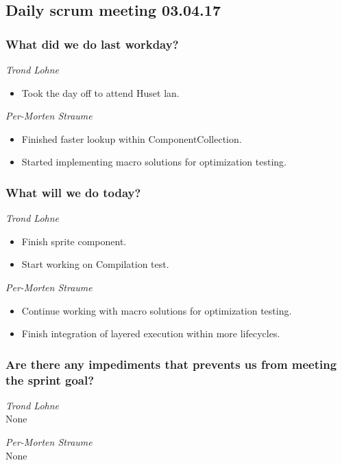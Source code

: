 \documentclass{article}
\begin{document}
\begin{center}
\subsection*{Daily scrum meeting 03.04.17}
\end{center}
\bigskip


\subsubsection*{What did we do last workday?}

\noindent\textit{Trond Lohne}
\begin{itemize}
    \item
    Took the day off to attend Huset lan.
\end{itemize}

\medskip

\noindent\textit{Per-Morten Straume}
\begin{itemize}
    \item
    Finished faster lookup within ComponentCollection.

    \item
    Started implementing macro solutions for optimization testing.
\end{itemize}


\subsubsection*{What will we do today?}

\noindent\textit{Trond Lohne}
\begin{itemize}
    \item
    Finish sprite component.

    \item
    Start working on Compilation test.
\end{itemize}

\medskip

\noindent\textit{Per-Morten Straume}
\begin{itemize}
    \item
    Continue working with macro solutions for optimization testing.

    \item
    Finish integration of layered execution within more lifecycles.
\end{itemize}


\subsubsection*{Are there any impediments that prevents us from meeting the sprint goal?}

\noindent\textit{Trond Lohne}\\
None

\medskip

\noindent\textit{Per-Morten Straume}\\
None
\end{document}
